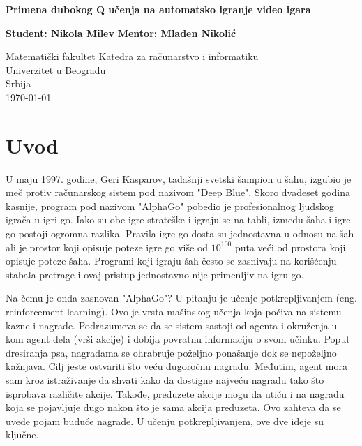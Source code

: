 \documentclass{article}
\begin{document}
\begin{titlepage}
    \begin{center}
        \vspace*{1cm}
        \textbf{Primena dubokog Q učenja na automatsko igranje video igara}
        
        \vspace{2.5cm}
        
        \textbf{Student: Nikola Milev}
        \textbf{Mentor: Mladen Nikolić}
        \vfill
        
        
        
        \vspace{0.8cm}
        
       
        
        Matematički fakultet
        Katedra za računarstvo i informatiku\\
        Univerzitet u Beogradu\\
        Srbija\\
        \today
        
    \end{center}
\end{titlepage}


\tableofcontents{}
\newpage
\section{Uvod}



U maju 1997. godine, Geri Kasparov, tadašnji svetski šampion u šahu, izgubio je meč protiv računarskog sistem pod nazivom "Deep Blue". Skoro dvadeset godina kasnije, program pod nazivom "AlphaGo" pobedio je profesionalnog ljudskog igrača u igri go. Iako su obe igre strateške i igraju se na tabli, između šaha i igre go postoji ogromna razlika. Pravila igre go dosta su jednostavna u odnosu na šah ali je prostor koji opisuje poteze igre go više od $10^{100}$ puta veći od prostora koji opisuje poteze šaha. Programi koji igraju šah često se zasnivaju na korišćenju stabala pretrage i ovaj pristup jednostavno nije primenljiv na igru go. 

Na čemu je onda zasnovan "AlphaGo"? U pitanju je učenje potkrepljivanjem (eng. reinforcement learning). Ovo je vrsta mašinskog učenja koja počiva na sistemu kazne i nagrade. Podrazumeva se da se sistem sastoji od agenta i okruženja u kom agent dela (vrši akcije) i dobija povratnu informaciju o svom učinku. Poput dresiranja psa, nagradama se ohrabruje poželjno ponašanje dok se nepoželjno kažnjava. Cilj jeste ostvariti što veću dugoročnu nagradu. Međutim, agent mora sam kroz istraživanje da shvati kako da dostigne najveću nagradu tako što isprobava različite akcije. Takođe, preduzete akcije mogu da utiču i na nagradu koja se pojavljuje dugo nakon što je sama akcija preduzeta. Ovo zahteva da se uvede pojam buduće nagrade. U učenju potkrepljivanjem, ove dve ideje su ključne.
\end{document}
